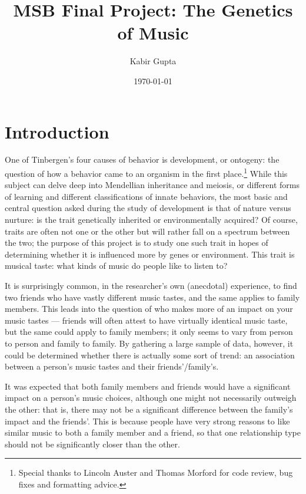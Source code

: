 \documentclass[12pt]{report}
\begin{document}
\title{MSB Final Project: The Genetics of Music}
\author{Kabir Gupta}
\date{\today}
\maketitle

\tableofcontents

\chapter*{Introduction}
One of Tinbergen's four causes of behavior is development, or ontogeny: the question of how a behavior came to an organism in the first place.\footnote{Special thanks to Lincoln Auster and Thomas Morford for code review, bug fixes and formatting advice.} While this subject can delve deep into Mendellian inheritance and meiosis, or different forms of learning and different classifications of innate behaviors, the most basic and central question asked during the study of development is that of nature versus nurture: is the trait genetically inherited or environmentally acquired? Of course, traits are often not one or the other but will rather fall on a spectrum between the two; the purpose of this project is to study one such trait in hopes of determining whether it is influenced more by genes or environment. This trait is musical taste: what kinds of music do people like to listen to?

It is surprisingly common, in the researcher's own (anecdotal) experience, to find two friends who have vastly different music tastes, and the same applies to family members. This leads into the question of who makes more of an impact on your music tastes --- friends will often attest to have virtually identical music taste, but the same could apply to family members; it only seems to vary from person to person and family to family. By gathering a large sample of data, however, it could be determined whether there is actually some sort of trend: an association between a person's music tastes and their friends'/family's.

It was expected that both family members and friends would have a significant impact on a person's music choices, although one might not necessarily outweigh the other: that is, there may not be a significant difference between the family's impact and the friends'. This is because people have very strong reasons to like similar music to both a family member and a friend, so that one relationship type should not be significantly closer than the other.
\end{document}
